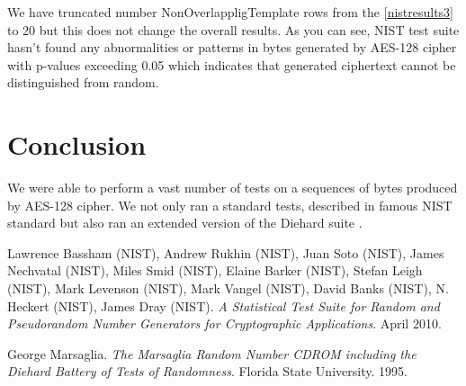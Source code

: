 \documentclass[conference]{IEEEtran}
\begin{document}
We have truncated number NonOverlappligTemplate rows from the \autoref{nistresults3} to 20 but this does not change the overall results. As you can see, NIST test suite hasn't found any abnormalities or patterns in bytes generated by AES-128 cipher with p-values exceeding 0.05 which indicates that  generated ciphertext cannot be distinguished from random. 

\section{Conclusion}
We were able to perform a vast number of tests on a sequences of bytes produced by AES-128 cipher. We not only ran a standard tests, described in famous NIST standard \cite{nisttests} but also ran an extended version of the Diehard suite \cite{diehardtests}. 
 

\begin{thebibliography}{9}

Lawrence Bassham (NIST), Andrew Rukhin (NIST), Juan Soto (NIST), James Nechvatal (NIST), Miles Smid (NIST), Elaine Barker (NIST), Stefan Leigh (NIST), Mark Levenson (NIST), Mark Vangel (NIST), David Banks (NIST), N. Heckert (NIST), James Dray (NIST). 
\textit{A Statistical Test Suite for Random and Pseudorandom Number Generators for Cryptographic Applications}. 
April 2010.

George Marsaglia. 
\textit{The Marsaglia Random Number CDROM including the Diehard Battery of Tests of Randomness}. 
Florida State University. 1995.

\end{thebibliography}
\end{document}
